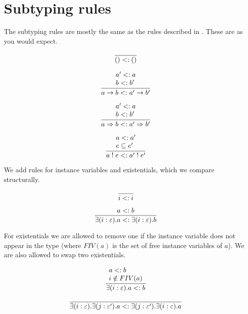\section{Subtyping rules}

The subtyping rules are mostly the same as the rules described in \cite{effectsystem}.
These are as you would expect.

\begin{minipage}{0.5\textwidth}
\[\frac{
}{
	() <: ()
}\]
\vspace{10pt}
\end{minipage}
\begin{minipage}{0.5\textwidth}
\[\frac{
	\begin{array}{l}
	a' <: a \\
	b <: b'
	\end{array}
}{
	a \rightarrow b <: a' \rightarrow b'
}\]
\vspace{10pt}
\end{minipage}
\begin{minipage}{0.5\textwidth}
\[\frac{
	\begin{array}{l}
	a' <: a \\
	b <: b'
	\end{array}
}{
	a \Rightarrow b <: a' \Rightarrow b'
}\]\vspace{10pt}
\end{minipage}
\begin{minipage}{0.5\textwidth}
\[\frac{
	\begin{array}{l}
	a <: a' \\
	e \subseteq e'
	\end{array}
}{
	a \; ! \; e <: a' \; ! \; e'
}\]\vspace{10pt}
\end{minipage}

We add rules for instance variables and existentials, which we compare structurally. \\
\begin{minipage}{0.5\textwidth}
\[\frac{
}{
	i <: i
}\]
\end{minipage}
\begin{minipage}{0.5\textwidth}
\[\frac{
	a <: b
}{
	\exists(i:\varepsilon) . a <: \exists(i:\varepsilon) . b
}\]
\end{minipage}

For existentials we are allowed to remove one if the instance variable does not appear in the type (where $FIV(a)$ is the set of free instance variables of $a$). We are also allowed to swap two existentials.\\
\begin{minipage}{0.5\textwidth}
\[\frac{
	\begin{array}{l}
	a <: b \\
	i \notin FIV(a)
	\end{array}
}{
	\exists(i:\varepsilon) . a <: b
}\]
\end{minipage}
\begin{minipage}{0.5\textwidth}
\[\frac{
}{
	\exists(i:\varepsilon) . \exists(j:\varepsilon') . a <: \exists(j:\varepsilon') . \exists(i:\varepsilon) . a
}\]
\end{minipage}

